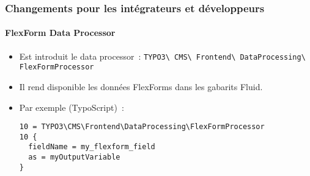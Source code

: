 %

\begin{frame}[fragile]
	\frametitle{Changements pour les intégrateurs et développeurs}
	\framesubtitle{FlexForm Data Processor}


	\begin{itemize}
		\item Est introduit le data processor~:\newline
			\small\texttt{TYPO3\textbackslash
				CMS\textbackslash
				Frontend\textbackslash
				DataProcessing\textbackslash
				FlexFormProcessor}\normalsize
		\item Il rend disponible les données FlexForms dans les gabarits Fluid.
		\item Par exemple (TypoScript)~:
\begin{lstlisting}
10 = TYPO3\CMS\Frontend\DataProcessing\FlexFormProcessor
10 {
  fieldName = my_flexform_field
  as = myOutputVariable
}
\end{lstlisting}

	\end{itemize}

\end{frame}

